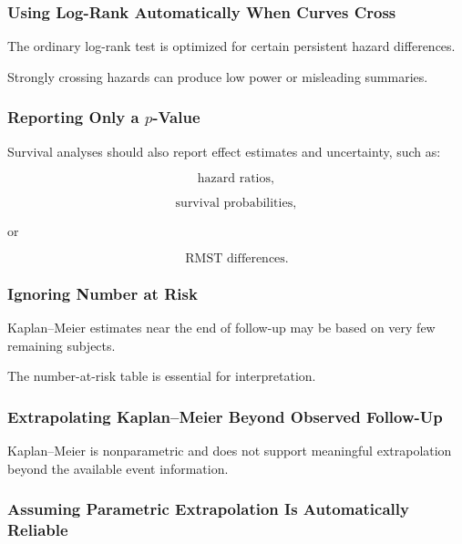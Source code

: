 \subsubsection{Using Log-Rank Automatically When Curves Cross}

The ordinary log-rank test is optimized for certain persistent hazard
differences.

Strongly crossing hazards can produce low power or misleading summaries.

\subsubsection{Reporting Only a \(p\)-Value}

Survival analyses should also report effect estimates and uncertainty,
such as:

\[
\boxed{
\text{hazard ratios},
}
\]

\[
\boxed{
\text{survival probabilities},
}
\]

or

\[
\boxed{
\text{RMST differences}.
}
\]

\subsubsection{Ignoring Number at Risk}

Kaplan--Meier estimates near the end of follow-up may be based on very few
remaining subjects.

The number-at-risk table is essential for interpretation.

\subsubsection{Extrapolating Kaplan--Meier Beyond Observed Follow-Up}

Kaplan--Meier is nonparametric and does not support meaningful
extrapolation beyond the available event information.

\subsubsection{Assuming Parametric Extrapolation Is Automatically Reliable}


